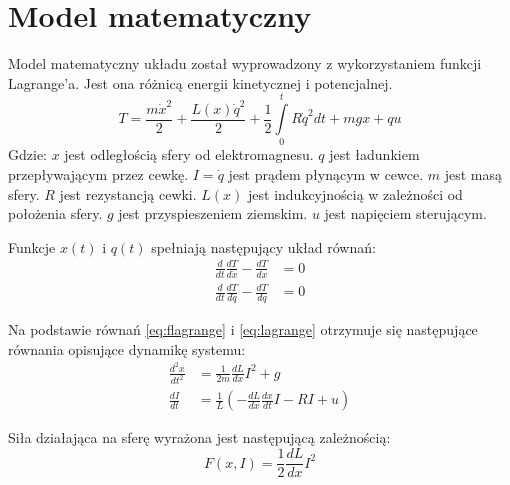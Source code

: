 \documentclass[11pt,a4paper]{article}
\begin{document}
\section{Model matematyczny}
\label{sec:modelmatematyczny}
Model matematyczny układu został wyprowadzony z wykorzystaniem funkcji Lagrange'a. Jest ona różnicą energii kinetycznej i potencjalnej.
\begin{equation}
T=\frac{m\dot x^2}{2}+\frac{L(x)\dot q^2}{2}+\frac{1}{2}\int\limits_0^t R\dot q^2dt+mgx+qu
\label{eq:flagrange}
\end{equation}
\noindent Gdzie:\newline
\(x\) jest odległością sfery od elektromagnesu.\newline
\(q\) jest ładunkiem przepływającym przez cewkę.\newline
\(I=\dot q\) jest prądem płynącym w cewce.\newline
\(m\) jest masą sfery.\newline
\(R\) jest rezystancją cewki.\newline
\(L(x)\) jest indukcyjnością w zależności od położenia sfery.\newline
\(g\) jest przyspieszeniem ziemskim.\newline
\(u\) jest napięciem sterującym.

Funkcje \(x(t)\) i \(q(t)\) spełniają następujący układ równań:
\begin{equation}
\begin{aligned}
\frac{d}{dt}\frac{dT}{d\dot x}-\frac{dT}{dx}&=0\\
\frac{d}{dt}\frac{dT}{d\dot q}-\frac{dT}{dq}&=0
\end{aligned}
\label{eq:lagrange}
\end{equation}

Na podstawie równań \eqref{eq:flagrange} i \eqref{eq:lagrange} otrzymuje się następujące równania opisujące dynamikę systemu:
\begin{equation}
\begin{aligned}
\frac{d^2x}{dt^2}&=\frac{1}{2m}\frac{dL}{dx}I^2+g\\
\frac{dI}{dt}&=\frac{1}{L}(-\frac{dL}{dx}\frac{dx}{dt}I-RI+u)
\end{aligned}
\label{eq:dynamic}
\end{equation}

Siła działająca na sferę wyrażona jest następującą zależnością:
\begin{equation}
F(x,I)=\frac{1}{2}\frac{dL}{dx}I^2
\end{equation}
\end{document}
